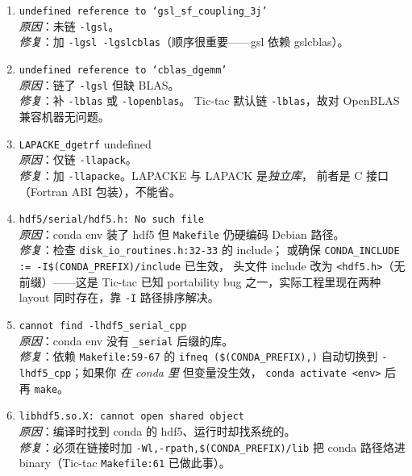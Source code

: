\begin{pitfallbox}[title={GSL/LAPACK/HDF5 三库的高频踩坑}]
\begin{enumerate}

\item \texttt{undefined reference to `gsl\_sf\_coupling\_3j'}\\
      \emph{原因}：未链 \texttt{-lgsl}。\\
      \emph{修复}：加 \texttt{-lgsl -lgslcblas}（顺序很重要——gsl 依赖 gslcblas）。

\item \texttt{undefined reference to `cblas\_dgemm'}\\
      \emph{原因}：链了 \texttt{-lgsl} 但缺 BLAS。\\
      \emph{修复}：补 \texttt{-lblas} 或 \texttt{-lopenblas}。
      Tic-tac 默认链 \texttt{-lblas}，故对 OpenBLAS 兼容机器无问题。

\item \texttt{LAPACKE\_dgetrf} undefined\\
      \emph{原因}：仅链 \texttt{-llapack}。\\
      \emph{修复}：加 \texttt{-llapacke}。LAPACKE 与 LAPACK 是\emph{独立库}，
      前者是 C 接口（Fortran ABI 包装），不能省。

\item \texttt{hdf5/serial/hdf5.h: No such file}\\
      \emph{原因}：conda env 装了 hdf5 但 \texttt{Makefile} 仍硬编码 Debian 路径。\\
      \emph{修复}：检查 \texttt{disk\_io\_routines.h:32-33} 的 include；
      或确保 \texttt{CONDA\_INCLUDE := -I\$(CONDA\_PREFIX)/include} 已生效，
      头文件 include 改为 \texttt{<hdf5.h>}（无前缀）——这是 Tic-tac 已知
      portability bug 之一，实际工程里现在两种 layout 同时存在，靠 \texttt{-I}
      路径排序解决。

\item \texttt{cannot find -lhdf5\_serial\_cpp}\\
      \emph{原因}：conda env 没有 \texttt{\_serial} 后缀的库。\\
      \emph{修复}：依赖 \texttt{Makefile:59-67} 的 \texttt{ifneq (\$(CONDA\_PREFIX),)}
      自动切换到 \texttt{-lhdf5\_cpp}；如果你 \emph{在 conda 里} 但变量没生效，
      \texttt{conda activate <env>} 后再 \texttt{make}。

\item \texttt{libhdf5.so.X: cannot open shared object}\\
      \emph{原因}：编译时找到 conda 的 hdf5、运行时却找系统的。\\
      \emph{修复}：必须在链接时加 \texttt{-Wl,-rpath,\$(CONDA\_PREFIX)/lib}
      把 conda 路径烙进 binary（Tic-tac \texttt{Makefile:61} 已做此事）。


\end{enumerate}
\end{pitfallbox}
